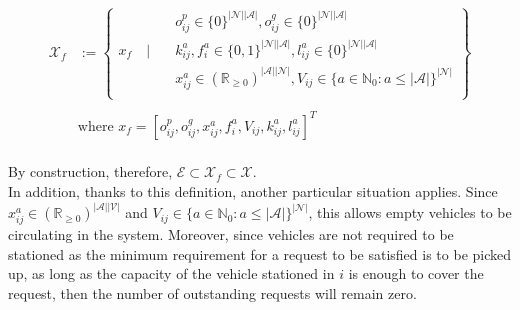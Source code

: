 \begin{equation}
	\begin{aligned}
	\mathcal{X}_f &:= \left\{
	\begin{aligned}
		& o^p_{ij} \in \{0\}^{|\mathcal{N}||\mathcal{A}|} , o^g_{ij} \in \{0\}^{|\mathcal{N}||\mathcal{A}|} \\
		x_f \quad \Bigg| \quad &k^a_{ij},f^a_{i} \in \{0,1\}^{|\mathcal{N}||\mathcal{A}|}, l^a_{ij}\in \{0\}^{|\mathcal{N}||\mathcal{A}|}\\%
		& x_{ij}^a\in (\mathbb{R}_{\ge 0})^{|\mathcal{A}||\mathcal{N}|}, V_{ij} \in \{ a \in \mathbb{N}_0: a \leq |\mathcal{A}| \}^{|\mathcal{N}|}\\%
	\end{aligned}
	\right\}\\
	&\\
	&\text{where } x_f = [o^p_{ij},o^g_{ij}, x_{ij}^a, f^a_{i}, V_{ij} , k^a_{ij}, l^a_{ij}]^T
	\end{aligned}
	\label{eq:final_x_f}
\end{equation}\\
By construction, therefore, $\mathcal{E} \subset \mathcal{X}_f \subset \mathcal{X}$. \\
In addition, thanks to this definition, another particular situation applies. Since $ x_{ij}^a\in (\mathbb{R}_{\ge 0})^{|\mathcal{A}||\mathcal{V}|}$ and $V_{ij} \in \{ a \in \mathbb{N}_0 : a \leq |\mathcal{A}| \}^{|\mathcal{N}|}$, this allows empty vehicles to be circulating in the system. Moreover, since vehicles are not required to be stationed as the minimum requirement for a request to be satisfied is to be picked up, as long as the capacity of the vehicle stationed in $i$ is enough to cover the request, then the number of outstanding requests will remain zero. 
